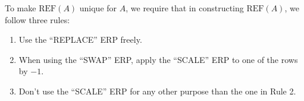 \documentclass{report}
\begin{document}
\vspace{0.5cm}
To make $\text{REF}(A)$ unique for $A$, we require that in constructing $\text{REF}(A)$, we follow three rules:

\begin{enumerate}
	\item Use the ``REPLACE'' ERP freely.
	\item When using the ``SWAP'' ERP, apply the ``SCALE'' ERP to one of the rows by $-1$.
	\item Don't use the ``SCALE'' ERP for any other purpose than the one in Rule 2.
\end{enumerate}
\end{document}
